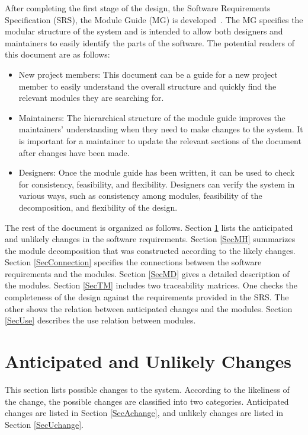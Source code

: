\documentclass[12pt, titlepage]{article}
\begin{document}
After completing the first stage of the design, the Software Requirements
Specification (SRS), the Module Guide (MG) is developed~\citep{ParnasEtAl1984}. The MG
specifies the modular structure of the system and is intended to allow both
designers and maintainers to easily identify the parts of the software.  The
potential readers of this document are as follows:

\begin{itemize}
\item New project members: This document can be a guide for a new project member
  to easily understand the overall structure and quickly find the
  relevant modules they are searching for.
\item Maintainers: The hierarchical structure of the module guide improves the
  maintainers' understanding when they need to make changes to the system. It is
  important for a maintainer to update the relevant sections of the document
  after changes have been made.
\item Designers: Once the module guide has been written, it can be used to
  check for consistency, feasibility, and flexibility. Designers can verify the
  system in various ways, such as consistency among modules, feasibility of the
  decomposition, and flexibility of the design.
\end{itemize}

The rest of the document is organized as follows. Section
\ref{SecChange} lists the anticipated and unlikely changes in the software
requirements. Section \ref{SecMH} summarizes the module decomposition that
was constructed according to the likely changes. Section \ref{SecConnection}
specifies the connections between the software requirements and the
modules. Section \ref{SecMD} gives a detailed description of the
modules. Section \ref{SecTM} includes two traceability matrices. One checks
the completeness of the design against the requirements provided in the SRS. The
other shows the relation between anticipated changes and the modules. Section
\ref{SecUse} describes the use relation between modules.

\section{Anticipated and Unlikely Changes} \label{SecChange}

This section lists possible changes to the system. According to the likeliness
of the change, the possible changes are classified into two
categories. Anticipated changes are listed in Section \ref{SecAchange}, and
unlikely changes are listed in Section \ref{SecUchange}.
\end{document}
